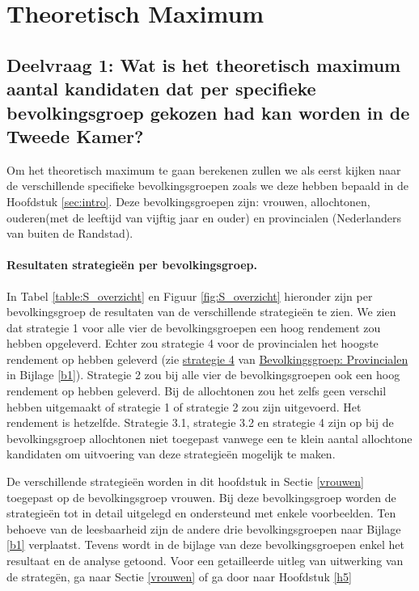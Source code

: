 \newpage
\section{Theoretisch Maximum}
\label{sec:eva}

\titlespacing*{\subsubsection}{0pt}{30pt}{10pt}


\subsection*{Deelvraag 1: Wat is het theoretisch maximum aantal kandidaten dat per specifieke bevolkingsgroep gekozen had kan worden in de Tweede Kamer?}

Om het theoretisch maximum te gaan berekenen zullen we als eerst kijken naar de verschillende specifieke bevolkingsgroepen zoals we deze hebben bepaald in de Hoofdstuk \ref{sec:intro}. Deze bevolkingsgroepen zijn: vrouwen, allochtonen, ouderen(met de leeftijd van vijftig jaar en ouder) en provincialen (Nederlanders van buiten de Randstad). 


\paragraph*{Resultaten strategie\"{e}n per bevolkingsgroep.} 
In Tabel \ref{table:S_overzicht} en Figuur \ref{fig:S_overzicht} hieronder zijn per bevolkingsgroep de resultaten van de verschillende strategie\"{e}n te zien. We zien dat strategie 1 voor alle vier de bevolkingsgroepen een hoog rendement zou hebben opgeleverd. Echter zou strategie 4 voor de provincialen het hoogste rendement op hebben geleverd (zie \hyperref[S4P]{strategie 4} van \hyperref[provincialen]{Bevolkingsgroep: Provincialen} in Bijlage \ref{b1}). Strategie 2 zou bij alle vier de bevolkingsgroepen ook een hoog rendement op hebben geleverd. Bij de allochtonen zou het zelfs geen verschil hebben uitgemaakt of strategie 1 of strategie 2 zou zijn uitgevoerd. Het rendement is hetzelfde. Strategie 3.1, strategie 3.2 en strategie 4 zijn op bij de bevolkingsgroep allochtonen niet toegepast vanwege een te klein aantal allochtone kandidaten om uitvoering van deze strategie\"{e}n mogelijk te maken.  

De verschillende strategie\"{e}n worden in dit hoofdstuk in Sectie \ref{vrouwen} toegepast op de bevolkingsgroep vrouwen. Bij deze bevolkingsgroep worden de strategie\"{e}n tot in detail uitgelegd en ondersteund met enkele voorbeelden. Ten behoeve van de leesbaarheid zijn de andere drie bevolkingsgroepen naar Bijlage \ref{b1} verplaatst. Tevens wordt in de bijlage van deze bevolkingsgroepen enkel het resultaat en de analyse getoond. Voor een getailleerde uitleg van uitwerking van de strateg\"{e}n, ga naar Sectie \ref{vrouwen} of ga door naar Hoofdstuk \ref{h5}

